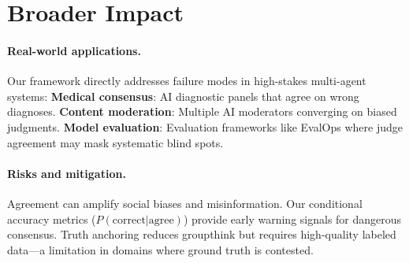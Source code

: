 \documentclass[11pt]{article}
\begin{document}
\section{Broader Impact}
\paragraph{Real-world applications.} Our framework directly addresses failure modes in high-stakes multi-agent systems:
\textbf{Medical consensus}: AI diagnostic panels that agree on wrong diagnoses.
\textbf{Content moderation}: Multiple AI moderators converging on biased judgments.
\textbf{Model evaluation}: Evaluation frameworks like EvalOps where judge agreement may mask systematic blind spots.

\paragraph{Risks and mitigation.} Agreement can amplify social biases and misinformation.
Our conditional accuracy metrics ($P(\text{correct}|\text{agree})$) provide early warning signals for dangerous consensus.
Truth anchoring reduces groupthink but requires high-quality labeled data—a limitation in domains where ground truth is contested.



\end{document}
